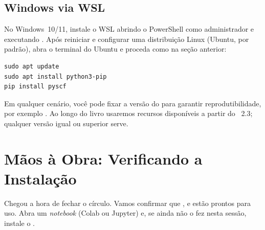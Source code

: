 \subsection{Windows via WSL}

No Windows~10/11, instale o WSL abrindo o PowerShell como administrador e
executando . Após reiniciar e configurar uma distribuição Linux
(Ubuntu, por padrão), abra o terminal do Ubuntu e proceda como na seção anterior:

\begin{lstlisting}[style=console]
sudo apt update
sudo apt install python3-pip
pip install pyscf
\end{lstlisting}

\begin{caixadica}
Em qualquer cenário, você pode fixar a versão do \pyscf{} para garantir
reprodutibilidade, por exemplo . Ao longo do livro
usaremos recursos disponíveis a partir do \pyscf{}~2.3; qualquer versão igual ou
superior serve.
\end{caixadica}

\section{Mãos à Obra: Verificando a Instalação}
\label{sec:maos}

Chegou a hora de fechar o círculo. Vamos confirmar que \python{}, \numpy{} e
\pyscf{} estão prontos para uso. Abra um \emph{notebook} (Colab ou Jupyter) e, se
ainda não o fez nesta sessão, instale o \pyscf{}.

